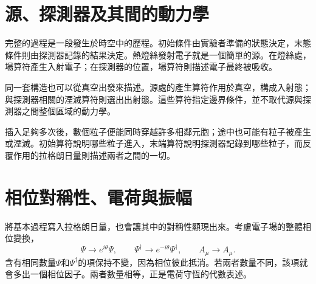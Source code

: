\section{源、探測器及其間的動力學}

完整的過程是一段發生於時空中的歷程。初始條件由實驗者準備的狀態決定，末態條件則由探測器記錄的結果決定。熱燈絲發射電子就是一個簡單的源。在燈絲處，場算符產生入射電子；在探測器的位置，場算符則描述電子最終被吸收。

\begin{classroomqa}
\end{classroomqa}

同一套構造也可以從真空出發來描述。源處的產生算符作用於真空，構成入射態；與探測器相關的湮滅算符則選出出射態。這些算符指定邊界條件，並不取代源與探測器之間整個區域的動力學。

\begin{classroomqa}
\end{classroomqa}

插入足夠多次後，數個粒子便能同時穿越許多相鄰元胞；途中也可能有粒子被產生或湮滅。初始算符說明哪些粒子進入，末端算符說明探測器記錄到哪些粒子，而反覆作用的拉格朗日量則描述兩者之間的一切。

\begin{classroomqa}
\end{classroomqa}

\section{相位對稱性、電荷與振幅}

將基本過程寫入拉格朗日量，也會讓其中的對稱性顯現出來。考慮電子場的整體相位變換，
\begin{equation}
\Psi\longrightarrow e^{i\theta}\Psi,
\qquad
\Psi^\dagger\longrightarrow e^{-i\theta}\Psi^\dagger,
\qquad
A_\mu\longrightarrow A_\mu.
\end{equation}
含有相同數量\(\Psi\)和\(\Psi^\dagger\)的項保持不變，因為相位彼此抵消。若兩者數量不同，該項就會多出一個相位因子。兩者數量相等，正是電荷守恆的代數表述。

